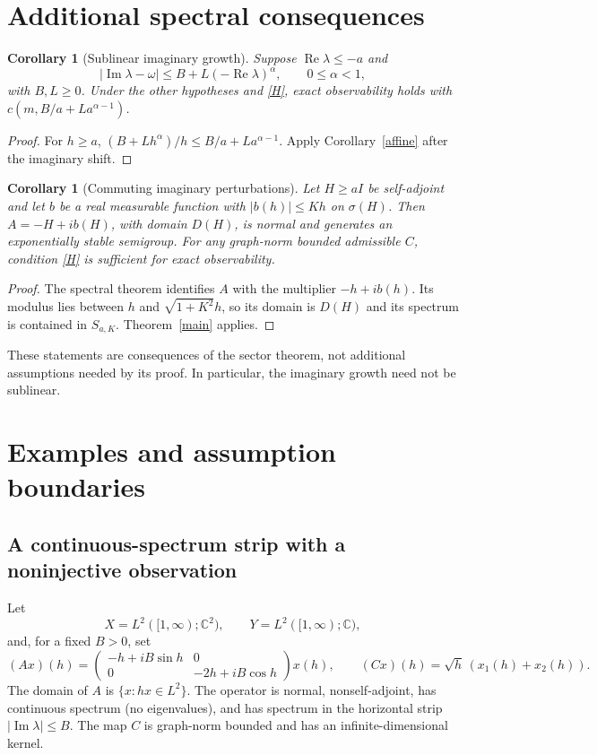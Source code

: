 \documentclass[11pt,a4paper]{article}
\newtheorem{corollary}[theorem]{Corollary}
\theoremstyle{definition}\newtheorem{definition}[theorem]{Definition}
\theoremstyle{remark}\newtheorem{remark}[theorem]{Remark}
\newcommand{\C}{\mathbb C}\newcommand{\R}{\mathbb R}\newcommand{\N}{\mathbb N}
\DeclareMathOperator{\Rea}{Re}\DeclareMathOperator{\Ima}{Im}
\begin{document}
\section{Additional spectral consequences}
\begin{corollary}[Sublinear imaginary growth]\label{sublinear}
Suppose $\Rea\lambda\le-a$ and
\[
 |\Ima\lambda-\omega|\le B+L(-\Rea\lambda)^\alpha,
 \qquad 0\le\alpha<1,
\]
with $B,L\ge0$. Under the other hypotheses and \eqref{H}, exact observability holds with $c(m,B/a+La^{\alpha-1})$.
\end{corollary}
\begin{proof}
For $h\ge a$, $(B+Lh^\alpha)/h\le B/a+La^{\alpha-1}$. Apply Corollary~\ref{affine} after the imaginary shift.
\end{proof}
\begin{corollary}[Commuting imaginary perturbations]\label{commuting}
Let $H\ge aI$ be self-adjoint and let $b$ be a real measurable function with $|b(h)|\le Kh$ on $\sigma(H)$. Then $A=-H+ib(H)$, with domain $D(H)$, is normal and generates an exponentially stable semigroup. For any graph-norm bounded admissible $C$, condition \eqref{H} is sufficient for exact observability.
\end{corollary}
\begin{proof}
The spectral theorem identifies $A$ with the multiplier $-h+ib(h)$. Its modulus lies between $h$ and $\sqrt{1+K^2}h$, so its domain is $D(H)$ and its spectrum is contained in $S_{a,K}$. Theorem~\ref{main} applies.
\end{proof}
These statements are consequences of the sector theorem, not additional assumptions needed by its proof. In particular, the imaginary growth need not be sublinear.

\section{Examples and assumption boundaries}\label{sec:examples}
\subsection{A continuous-spectrum strip with a noninjective observation}
Let
\[
 X=L^2([1,\infty);\C^2),\qquad Y=L^2([1,\infty);\C),
\]
and, for a fixed $B>0$, set
\[
 (Ax)(h)=\begin{pmatrix}-h+iB\sin h&0\\0&-2h+iB\cos h\end{pmatrix}x(h),
 \qquad (Cx)(h)=\sqrt h\,(x_1(h)+x_2(h)).
\]
The domain of $A$ is $\{x:hx\in L^2\}$. The operator is normal, nonself-adjoint, has continuous spectrum (no eigenvalues), and has spectrum in the horizontal strip $|\Ima\lambda|\le B$. The map $C$ is graph-norm bounded and has an infinite-dimensional kernel.
\end{document}
